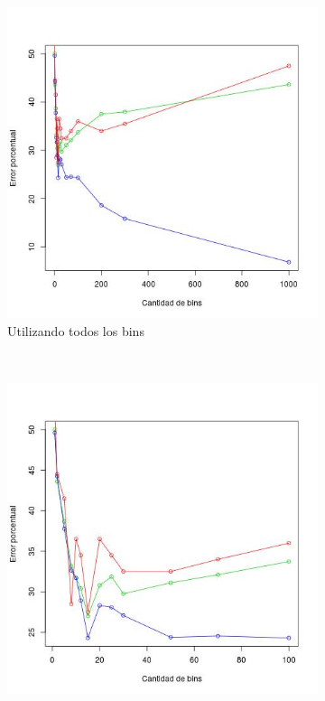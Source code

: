 \documentclass[12pt, a4paper]{article}
\begin{document}
\begin{figure}
    \centering

    \begin{subfigure}[b]{0.45\textwidth}
        \includegraphics[width=\textwidth]{errorea}
        \caption{Utilizando todos los bins}
    \end{subfigure}
      ~ %
    \begin{subfigure}[b]{0.45\textwidth}
        \includegraphics[width=\textwidth]{errorea2}

\end{subfigure}
\end{figure}
\end{document}
